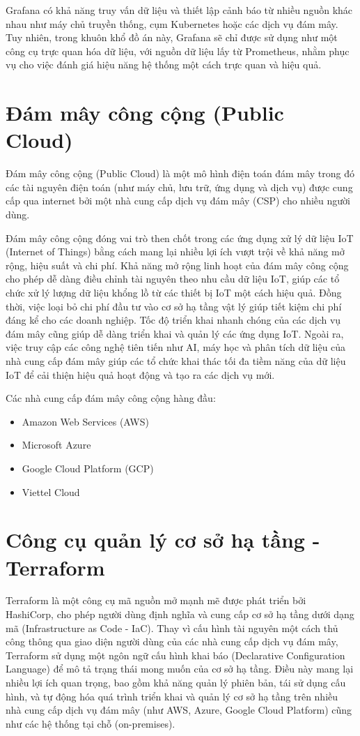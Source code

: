 Grafana có khả năng truy vấn dữ liệu và thiết lập cảnh báo từ nhiều nguồn khác nhau như máy chủ truyền thống, cụm Kubernetes hoặc các dịch vụ đám mây. Tuy nhiên, trong khuôn khổ đồ án này, Grafana sẽ chỉ được sử dụng như một công cụ trực quan hóa dữ liệu, với nguồn dữ liệu lấy từ Prometheus, nhằm phục vụ cho việc đánh giá hiệu năng hệ thống một cách trực quan và hiệu quả.

\section{Đám mây công cộng (Public Cloud)}

Đám mây công cộng (Public Cloud) là một mô hình điện toán đám mây trong đó các tài nguyên điện toán (như máy chủ, lưu trữ, ứng dụng và dịch vụ) được cung cấp qua internet bởi một nhà cung cấp dịch vụ đám mây (CSP) cho nhiều người dùng.

Đám mây công cộng đóng vai trò then chốt trong các ứng dụng xử lý dữ liệu IoT (Internet of Things) bằng cách mang lại nhiều lợi ích vượt trội về khả năng mở rộng, hiệu suất và chi phí. Khả năng mở rộng linh hoạt của đám mây công cộng cho phép dễ dàng điều chỉnh tài nguyên theo nhu cầu dữ liệu IoT, giúp các tổ chức xử lý lượng dữ liệu khổng lồ từ các thiết bị IoT một cách hiệu quả. Đồng thời, việc loại bỏ chi phí đầu tư vào cơ sở hạ tầng vật lý giúp tiết kiệm chi phí đáng kể cho các doanh nghiệp. Tốc độ triển khai nhanh chóng của các dịch vụ đám mây cũng giúp dễ dàng triển khai và quản lý các ứng dụng IoT. Ngoài ra, việc truy cập các công nghệ tiên tiến như AI, máy học và phân tích dữ liệu của nhà cung cấp đám mây giúp các tổ chức khai thác tối đa tiềm năng của dữ liệu IoT để cải thiện hiệu quả hoạt động và tạo ra các dịch vụ mới.

Các nhà cung cấp đám mây công cộng hàng đầu:
\begin{itemize}
    \item Amazon Web Services (AWS)
    \item Microsoft Azure
    \item Google Cloud Platform (GCP)
    \item Viettel Cloud
\end{itemize}

\section{Công cụ quản lý cơ sở hạ tầng - Terraform}

Terraform \autocite{terraform} là một công cụ mã nguồn mở mạnh mẽ được phát triển bởi HashiCorp, cho phép người dùng định nghĩa và cung cấp cơ sở hạ tầng dưới dạng mã (Infrastructure as Code - IaC). Thay vì cấu hình tài nguyên một cách thủ công thông qua giao diện người dùng của các nhà cung cấp dịch vụ đám mây, Terraform sử dụng một ngôn ngữ cấu hình khai báo (Declarative Configuration Language) để mô tả trạng thái mong muốn của cơ sở hạ tầng. Điều này mang lại nhiều lợi ích quan trọng, bao gồm khả năng quản lý phiên bản, tái sử dụng cấu hình, và tự động hóa quá trình triển khai và quản lý cơ sở hạ tầng trên nhiều nhà cung cấp dịch vụ đám mây (như AWS, Azure, Google Cloud Platform) cũng như các hệ thống tại chỗ (on-premises).

